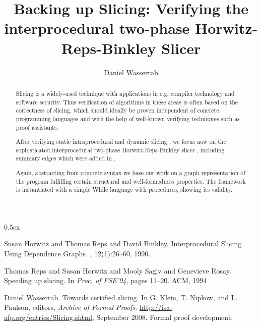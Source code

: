 \documentclass[11pt,a4paper,notitlepage]{report}
\begin{document}
\title{Backing up Slicing: Verifying the interprocedural two-phase Horwitz-Reps-Binkley Slicer}
\author{Daniel Wasserrab}
\maketitle

\begin{abstract}
Slicing is a widely-used technique with applications in e.g. compiler
technology and software security. Thus verification of
algorithms in these areas is often based on the correctness of slicing,
which should ideally be proven independent of concrete programming
languages and with the help of well-known verifying techniques such as
proof assistants. 

After verifying static intraprocedural and dynamic slicing \cite{Wasserrab:08}, we
focus now on the sophisticated interprocedural two-phase Horwitz-Reps-Binkley slicer
\cite{HorwitzRB:88}, including summary edges which were added in \cite{RepsHSR:94}.

Again, abstracting from concrete syntax we base our work on a graph
representation of the program fulfilling certain structural
and well-formedness properties. The framework is instantiated with a simple 
While language with procedures, showing its validity.
\end{abstract}

\parindent 0pt\parskip 0.5ex



\begin{thebibliography}{10}

Susan Horwitz and Thomas Reps and David Binkley.
\newblock Interprocedural Slicing Using Dependence Graphs.
, 12(1):26--60, 1990.

Thomas Reps and Susan Horwitz and Mooly Sagiv and Genevieve Rosay.
\newblock Speeding up slicing.
\newblock In {\em Proc. of FSE'94}, pages 11--20. ACM, 1994

\newblock Daniel Wasserrab.
\newblock Towards certified slicing.
\newblock In G. Klein, T. Nipkow, and L. Paulson, editors, {\em Archive of Formal
Proofs}.
\newblock \url{http://isa-afp.org/entries/Slicing.shtml}, September 2008.
\newblock Formal proof development.

\end{thebibliography}
\end{document}

